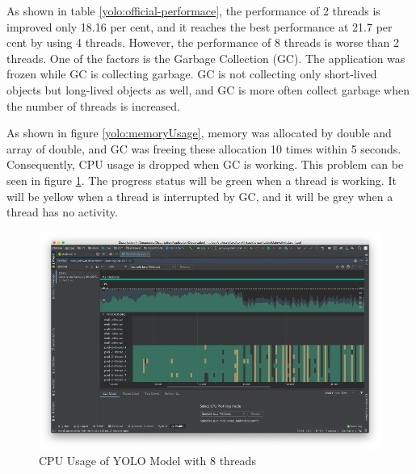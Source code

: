             As shown in table \ref{yolo:official-performace},
                the performance of 2 threads is improved only 18.16 per cent,
                and it reaches the best performance at 21.7 per cent by using 4 threads.
            However, the performance of 8 threads is worse than 2 threads.
                One of the factors is the Garbage Collection (GC).
                The application was frozen while GC is collecting garbage.
            GC is not collecting only short-lived objects but long-lived objects as well,
                and GC is more often collect garbage when the number of threads is increased.

            As shown in figure \ref{yolo:memoryUsage}, memory was allocated by double and array of double,
                and GC was freeing these allocation 10 times within 5 seconds.
            Consequently, CPU usage is dropped when GC is working.
                This problem can be seen in figure \ref{yolo:cpuUsage}.
                The progress status will be green when a thread is working.
                It will be yellow when a thread is interrupted by GC,
                and it will be grey when a thread has no activity.

            \begin{figure}[!ht]
                \includegraphics[width=6in]{images/chapter5/YOLO/cpu-usage-8threads.png}
                \caption{CPU Usage of YOLO Model with 8 threads}
                \label{yolo:cpuUsage}
            \end{figure}

